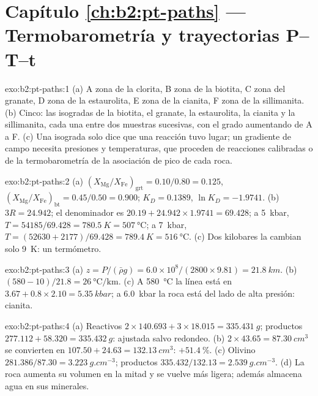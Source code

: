 \section*{Capítulo \ref{ch:b2:pt-paths} --- Termobarometría y trayectorias P--T--t}

\begin{solution}{exo:b2:pt-paths:1}
(a) A zona de la clorita, B zona de la biotita, C zona del granate, D zona de la estaurolita, E zona de la cianita,
F zona de la sillimanita. (b) Cinco: las isogradas de la biotita, el granate, la estaurolita, la cianita y la
sillimanita, cada una entre dos muestras sucesivas, con el grado aumentando de A a F. (c) Una isograda
solo dice que una reacción tuvo lugar; un gradiente de campo necesita presiones y temperaturas, que
proceden de reacciones calibradas o de la termobarometría de la asociación de pico de cada
roca.
\end{solution}

\begin{solution}{exo:b2:pt-paths:2}
(a) $(X_{\text{Mg}}/X_{\text{Fe}})_{\text{grt}} = 0.10/0.80 = 0.125$,
$(X_{\text{Mg}}/X_{\text{Fe}})_{\text{bt}} = 0.45/0.50 = 0.900$; $K_D = 0.1389$, $\ln K_D =
-1.9741$. (b) $3R = 24.942$; el denominador es $20.19 + 24.942\times1.9741 = 69.428$; a
\qty{5}{kbar}, $T = 54185/69.428 = \qty{780.5}{K} = \qty{507}{\celsius}$; a
\qty{7}{kbar}, $T = (52630 + 2177)/69.428 = \qty{789.4}{K} = \qty{516}{\celsius}$.
(c) Dos kilobares la cambian solo \qty{9}{K}: un termómetro.
\end{solution}

\begin{solution}{exo:b2:pt-paths:3}
(a) $z = P/(\bar\rho g) = 6.0\times10^8/(2800\times9.81) = \qty{21.8}{km}$.
(b) $(580 - 10)/21.8 = \qty{26}{\celsius\per\km}$. (c) A \qty{580}{\celsius} la línea
está en $3.67 + 0.8\times2.10 = \qty{5.35}{kbar}$; a \qty{6.0}{kbar} la roca está del
lado de alta presión: cianita.
\end{solution}

\begin{solution}{exo:b2:pt-paths:4}
(a) Reactivos $2\times140.693 + 3\times18.015 = \qty{335.431}{g}$; productos $277.112 +
58.320 = \qty{335.432}{g}$: ajustada salvo redondeo. (b) $2\times43.65 =
\qty{87.30}{cm^3}$ se convierten en $107.50 + 24.63 = \qty{132.13}{cm^3}$: $+\qty{51.4}{\percent}$.
(c) Olivino $281.386/87.30 = \qty{3.223}{g.cm^{-3}}$; productos $335.432/132.13 =
\qty{2.539}{g.cm^{-3}}$. (d) La roca aumenta su volumen en la mitad y se vuelve más ligera; además
almacena agua en sus minerales.
\end{solution}

